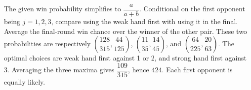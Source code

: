 The given win probability simplifies to $\dfrac{a}{a+b}$. Conditional on the first opponent being $j=1,2,3$, compare using the weak hand first with using it in the final. Average the final-round win chance over the winner of the other pair. These two probabilities are respectively $(\dfrac{128}{315},\dfrac{44}{125})$, $(\dfrac{11}{35},\dfrac{14}{45})$, and $(\dfrac{64}{225},\dfrac{20}{63})$. The optimal choices are weak hand first against 1 or 2, and strong hand first against 3. Averaging the three maxima gives $\dfrac{109}{315}$, hence $\boxed{424}$. Each first opponent is equally likely.
